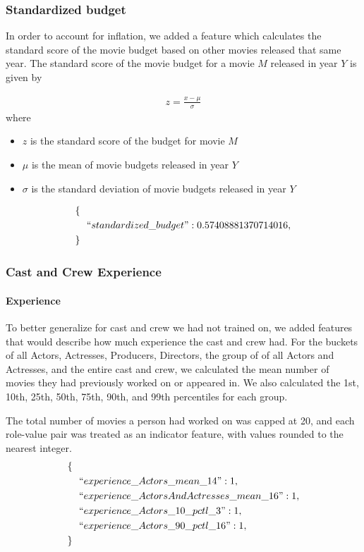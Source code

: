 \documentclass[journal]{IEEEtran}
\begin{document}
\subsubsection{Standardized budget}
In order to account for inflation, we added a feature which calculates the
standard score of the movie budget based on other movies released that same
year.  The standard score of the movie budget for a movie $M$ released in year
$Y$ is given by

\begin{eqnarray*}
    z = \frac{x - \mu}{\sigma}
\end{eqnarray*}
where
\begin{itemize}
    \item $z$ is the standard score of the budget for movie $M$
    \item $\mu$ is the mean of movie budgets released in year $Y$
    \item $\sigma$ is the standard deviation of movie budgets released in year $Y$
\end{itemize}
\begin{align*}
        \{\ \ &\\
        &``standardized\_budget": 0.57408881370714016,\\
        \}\ \ &
\end{align*}

\subsubsection{Cast and Crew Experience}
\paragraph{Experience}

To better generalize for cast and crew we had not trained on, we added features that would describe how much experience the cast and crew had.  For the buckets of all Actors, Actresses, Producers, Directors, the group of of all Actors and Actresses, and the entire cast and crew, we calculated the mean number of movies they had previously worked on or appeared in.  We also calculated the 1st, 10th, 25th, 50th, 75th, 90th, and 99th percentiles for each group.
\begin{center}
\end{center}

The total number of movies a person had worked on was capped at 20, and each role-value pair was treated as an indicator feature, with values rounded to the nearest integer.
\begin{align*}
        \{\ \ &\\
        &``experience\_Actors\_mean\_14": 1,\\
        &``experience\_ActorsAndActresses\_mean\_16": 1,\\
        &``experience\_Actors\_10\_pctl\_3": 1,\\
        &``experience\_Actors\_90\_pctl\_16": 1,\\
        \}\ \ &
\end{align*}
\end{document}
